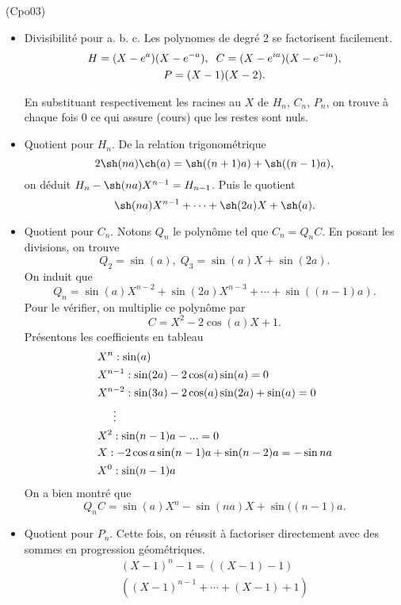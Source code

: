 \begin{tiny}(Cpo03)\end{tiny} 
\begin{itemize}
  \item Divisibilité pour a. b. c.\newline
Les polynomes de degré 2 se factorisent facilement.
\begin{multline*}
  H = (X-e^a)(X-e^{-a}), \hspace{0.2cm} C = (X-e^{ia})(X-e^{-ia}), \\
  P = (X-1)(X-2).
\end{multline*}

En substituant respectivement les racines au $X$ de $H_n$, $C_n$, $P_n$, on trouve à chaque fois $0$ ce qui assure (cours) que les restes sont nuls.

  \item Quotient pour $H_n$.\newline
De la relation trigonométrique
\[
  2\sh(na) \ch(a) = \sh((n+1)a) + \sh((n-1)a),
\]
on déduit $H_n - \sh(na)X^{n-1} = H_{n-1}$.\newline
Puis le quotient
\[
  \sh(na)X^{n-1} + \cdots + \sh(2a)X + \sh(a).
\]

  \item Quotient pour $C_n$.\newline
Notons $Q_n$ le polynôme tel que $C_n = Q_n C$. En posant les divisions, on trouve
\[
  Q_2 = \sin(a), \; Q_3 = \sin(a) X + \sin(2a).
\]
On induit que 
\[
  Q_n = \sin(a) X^{n-2} + \sin(2a)X^{n-3} + \cdots + \sin((n-1)a).
\]
Pour le vérifier, on multiplie ce polynôme par
\[
  C = X^2 - 2\cos(a) X + 1.
\]
Présentons les coefficients en tableau
\begin{align*}
  &X^n : \sin(a) \\
  &X^{n-1} : \sin(2a) - 2\cos(a)\sin(a) = 0 \\
  &X^{n-2} : \sin(3a) - 2\cos(a)\sin(2a) + \sin(a) = 0\\
  & \hspace{0.5cm} \vdots                                         \\
  &X^{2} : \sin(n-1)a -                    ...  = 0\\
  &X  : - 2\cos a\sin(n-1)a + \sin(n-2)a = -\sin na\\
  &X^0 : \sin(n-1)a  
\end{align*}
On a bien montré que
\[
  Q_n C = \sin(a)X^n - \sin(na) X + \sin((n-1)a.
\]

  \item Quotient pour $P_n$.\newline
Cette fois, on réussit à factoriser directement avec des sommes en progression géométriques.
\begin{multline*}
  (X-1)^n - 1 =   \left((X -1) - 1 \right) \\ 
  \left( (X-1)^{n-1} +  \cdots + (X-1) + 1\right)
\end{multline*}


\end{itemize}

